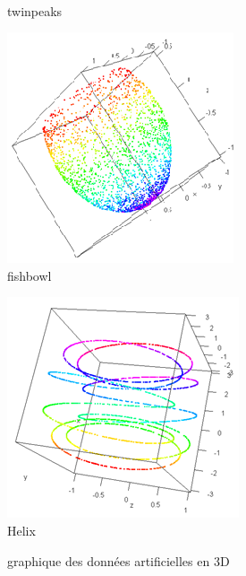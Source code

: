 \documentclass[twoside,twocolumn]{article}
\begin{document}
\begin{figure}[ht!]
\begin{minipage}[c]{0.45\linewidth}
   \\twinpeaks
   \end{minipage}
   \begin{minipage}[c]{0.45\linewidth}
      \centering \includegraphics[width=\textwidth]{fishbowl.png}
   \\fishbowl
   \end{minipage}\hfill
   \begin{minipage}[c]{0.45\linewidth}   
      \centering \includegraphics[width=\textwidth]{helix.png}
   \\Helix
   \end{minipage}
   \caption{graphique des données artificielles en 3D}
   \label{data_art}
\end{figure}
\end{document}
